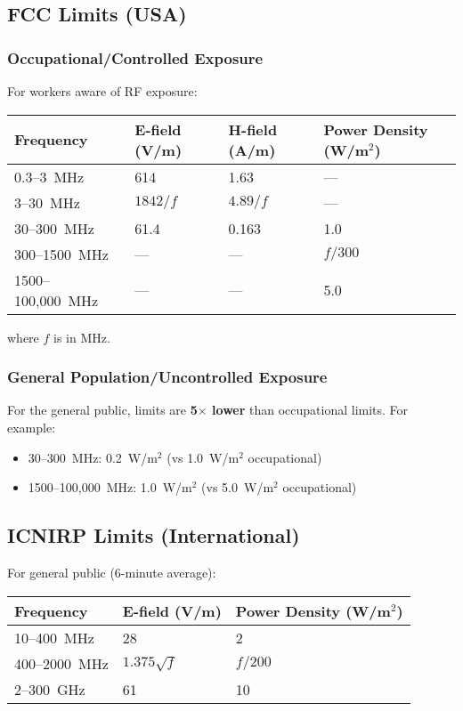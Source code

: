 \subsection{FCC Limits (USA)}

\subsubsection{Occupational/Controlled Exposure}

For workers aware of RF exposure:

\begin{center}
\begin{tabular}{@{}llll@{}}
\toprule
Frequency & E-field (V/m) & H-field (A/m) & Power Density (W/m$^2$) \\
\midrule
0.3--3~MHz & 614 & 1.63 & --- \\
3--30~MHz & $1842/f$ & $4.89/f$ & --- \\
30--300~MHz & 61.4 & 0.163 & 1.0 \\
300--1500~MHz & --- & --- & $f/300$ \\
1500--100,000~MHz & --- & --- & 5.0 \\
\bottomrule
\end{tabular}
\end{center}

where $f$ is in MHz.

\subsubsection{General Population/Uncontrolled Exposure}

For the general public, limits are \textbf{5$\times$ lower} than occupational limits. For example:
\begin{itemize}
\item 30--300~MHz: 0.2~W/m$^2$ (vs 1.0~W/m$^2$ occupational)
\item 1500--100,000~MHz: 1.0~W/m$^2$ (vs 5.0~W/m$^2$ occupational)
\end{itemize}

\subsection{ICNIRP Limits (International)}

For general public (6-minute average):

\begin{center}
\begin{tabular}{@{}lll@{}}
\toprule
Frequency & E-field (V/m) & Power Density (W/m$^2$) \\
\midrule
10--400~MHz & 28 & 2 \\
400--2000~MHz & $1.375\sqrt{f}$ & $f/200$ \\
2--300~GHz & 61 & 10 \\
\bottomrule
\end{tabular}
\end{center}

